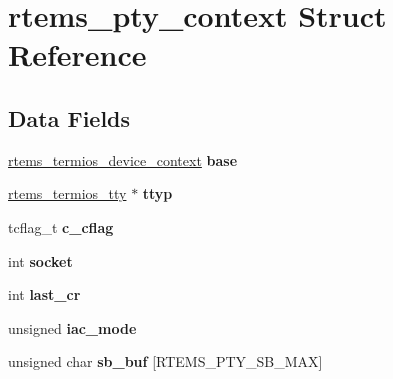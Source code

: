 \hypertarget{structrtems__pty__context}{}\section{rtems\+\_\+pty\+\_\+context Struct Reference}
\label{structrtems__pty__context}
\subsection*{Data Fields}
\begin{DoxyCompactItemize}
\item 
\mbox{\label{structrtems__pty__context_a4a08db4b3fb9dc66bb0d1cdcdc5a13d3}} 
\mbox{\hyperlink{structrtems__termios__device__context}{rtems\+\_\+termios\+\_\+device\+\_\+context}} {\bfseries base}
\item 
\mbox{\label{structrtems__pty__context_aed2019863b359978c0e352985c85c96a}} 
\mbox{\hyperlink{structrtems__termios__tty}{rtems\+\_\+termios\+\_\+tty}} $\ast$ {\bfseries ttyp}
\item 
\mbox{\label{structrtems__pty__context_a13d846bd87ae6ab3c8556cec3d4d77a1}} 
tcflag\+\_\+t {\bfseries c\+\_\+cflag}
\item 
\mbox{\label{structrtems__pty__context_a4ea2c79d6d1fc4d3430a92a388e424d1}} 
int {\bfseries socket}
\item 
\mbox{\label{structrtems__pty__context_af8048d16030902a4acf8fa242c4cf2dd}} 
int {\bfseries last\+\_\+cr}
\item 
\mbox{\label{structrtems__pty__context_a7cc0d07b4d60e62a802d65abc10a8ec8}} 
unsigned {\bfseries iac\+\_\+mode}
\item 
\mbox{\label{structrtems__pty__context_a629be31ccb2d5bfb033c574637744e61}} 
unsigned char {\bfseries sb\+\_\+buf} \mbox{[}R\+T\+E\+M\+S\+\_\+\+P\+T\+Y\+\_\+\+S\+B\+\_\+\+M\+AX\mbox{]}
\item 
\mbox{\label{structrtems__pty__context_a06c8b09f0a2971ad204cd44e545899d1}} 

\end{DoxyCompactItemize}
